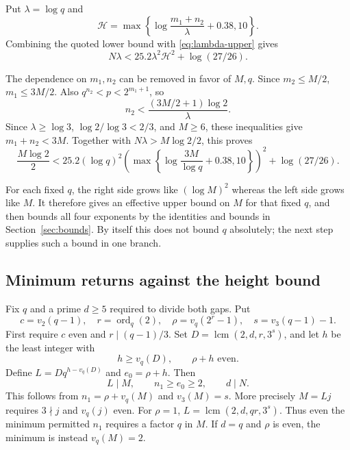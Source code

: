 \documentclass[11pt]{article}
\begin{document}
Put $\lambda=\log q$ and
\[
\mathcal H=\max\left\{\log\frac{m_1+n_2}{\lambda}+0.38,10\right\}.
\]
Combining the quoted lower bound with \eqref{eq:lambda-upper} gives
\begin{equation}\label{eq:baker-gap}
N\lambda<25.2\lambda^2\mathcal H^2+\log(27/26).
\end{equation}

The dependence on $m_1,n_2$ can be removed in favor of $M,q$.
Since $m_2\leq M/2$, $m_1\leq3M/2$. Also
$q^{n_2}<p<2^{m_1+1}$, so
\[
n_2<\frac{(3M/2+1)\log2}{\lambda}.
\]
Since $\lambda\geq\log3$, $\log2/\log3<2/3$, and $M\geq6$,
these inequalities give $m_1+n_2<3M$.
Together with $N\lambda>M\log2/2$, this proves
\begin{equation}\label{eq:baker-M}
\boxed{
\frac{M\log2}{2}
<25.2(\log q)^2
\left(\max\left\{\log\frac{3M}{\log q}+0.38,10\right\}\right)^2
+\log(27/26).}
\end{equation}

For each fixed $q$, the right side grows like $(\log M)^2$ whereas the
left side grows like $M$. It therefore gives an effective upper bound
on $M$ for that fixed $q$, and then bounds all four exponents by the
identities and bounds in Section~\ref{sec:bounds}. By itself this does not bound $q$
absolutely; the next step supplies such a bound in one branch.

\subsection{Minimum returns against the height bound}
\label{sec:minimum-returns}
Fix $q$ and a prime $d\ge5$ required to divide both gaps. Put
\[
c=v_2(q-1),\quad r=\operatorname{ord}_q(2),\quad
\rho=v_q(2^r-1),\quad s=v_3(q-1)-1.
\]
First require $c$ even and $r\mid(q-1)/3$.
Set $D=\operatorname{lcm}(2,d,r,3^s)$, and let $h$ be the least
integer with
\[
h\ge v_q(D),\qquad \rho+h\text{ even}.
\]
Define $L=Dq^{h-v_q(D)}$ and $e_0=\rho+h$. Then
\begin{equation}\label{eq:minimum-return}
\boxed{L\mid M,\qquad n_1\ge e_0\ge2,\qquad d\mid N.}
\end{equation}
This follows from $n_1=\rho+v_q(M)$ and
$v_3(M)=s$. More precisely $M=Lj$ requires
$3\nmid j$ and $v_q(j)$ even.
For $\rho=1$, $L=\operatorname{lcm}(2,d,qr,3^s)$.
Thus even the minimum permitted $n_1$ requires a factor $q$ in $M$.
If $d=q$ and $\rho$ is even, the minimum is instead $v_q(M)=2$.
\end{document}
